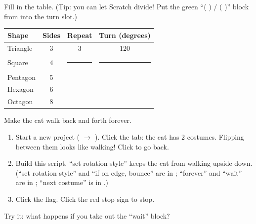 Fill in the table. (Tip: you can let Scratch divide! Put the green \enquote{( ) / ( )} block from  into the turn slot.)

\begin{center}
\renewcommand{\arraystretch}{1.4}
\begin{tabular}{|l|c|c|c|}
\hline
\textbf{Shape} & \textbf{Sides} & \textbf{Repeat} & \textbf{Turn (degrees)} \\ \hline
Triangle & 3 & 3 & 120 \\ \hline
Square & 4 & \rule{1cm}{0pt} & \rule{1.5cm}{0pt} \\ \hline
Pentagon & 5 & & \\ \hline
Hexagon & 6 & & \\ \hline
Octagon & 8 & & \\ \hline
\end{tabular}
\end{center}

\begin{exercise}
Make the cat walk back and forth forever.
\begin{enumerate}[leftmargin=1.4em,itemsep=1pt]
  \item Start a new project ( $\rightarrow$ ). Click the  tab: the cat has 2 costumes. Flipping between them looks like walking! Click  to go back.
  \item Build this script. \enquote{set rotation style} keeps the cat from walking upside down. (\enquote{set rotation style} and \enquote{if on edge, bounce} are in ; \enquote{forever} and \enquote{wait} are in ; \enquote{next costume} is in .)
  \item Click the flag. Click the red stop sign to stop.
\end{enumerate}
\begin{center}
\begin{scratch}[scale=0.85]
\end{scratch}
\end{center}
Try it: what happens if you take out the \enquote{wait} block? 
\end{exercise}


